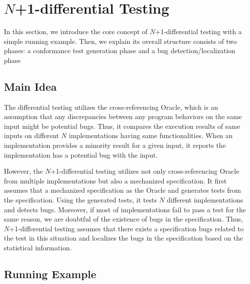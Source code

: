 \section{$N$+1-differential Testing}\label{sec:idea}

In this section, we introduce the core concept of $N$+1-differential testing with a
simple running example.  Then, we explain its overall structure consists of two
phases: a conformance test generation phase and a bug detection/localization
phase

\subsection{Main Idea}

The differential testing utilizes the cross-referencing Oracle, which is an
assumption that any discrepancies between any program behaviors on the same input
might be potential bugs.  Thus, it compares the execution results of same
inputs on different $N$ implementations having same functionalities.  When an
implementation provides a minority result for a given input, it reports the
implementation has a potential bug with the input.

However, the $N$+1-differential testing utilizes not only cross-referencing Oracle
from multiple implementations but also a mechanized specification.  It first
assumes that a mechanized specification as the Oracle and generates tests from
the specification.  Using the generated tests, it tests $N$ different
implementations and detects bugs.  Moreover, if most of implementations fail to
pass a test for the same reason, we are doubtful of the existence of bugs in
the specification.  Thus, $N$+1-differential testing assumes that there exists a
specification bugs related to the test in this situation and localizes the bugs
in the specification based on the statistical information.


\subsection{Running Example}

